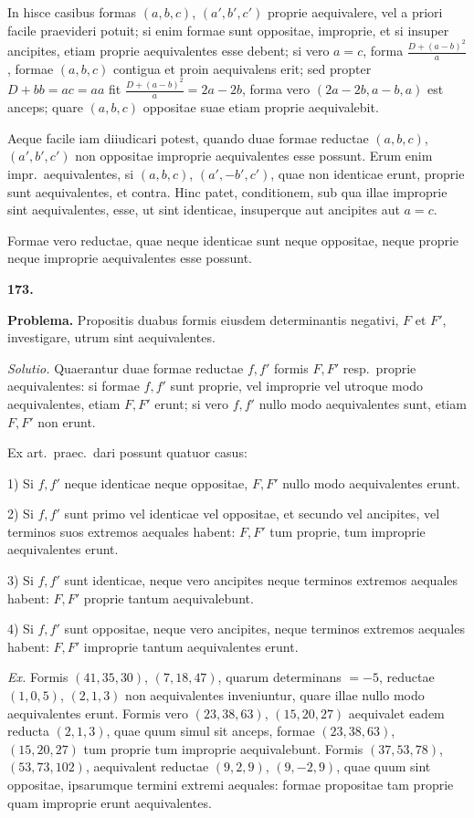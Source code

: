 \documentclass[12pt,a4paper]{article}
\theoremstyle{plain}
\theoremstyle{definition}
\theoremstyle{remark}
\begin{document}
In hisce casibus formas $(a,b,c)$, $(a',b',c')$ proprie aequivalere, vel a priori facile praevideri potuit; si enim formae sunt oppositae, improprie, et si insuper ancipites, etiam proprie aequivalentes esse debent; si vero $a=c$, forma $\frac{D+(a-b)^2}{a}$, formae $(a,b,c)$ contigua et proin aequivalens erit; sed propter $D+bb=ac=aa$ fit $\frac{D+(a-b)^2}{a}=2a-2b$, forma vero $(2a-2b,a-b,a)$ est anceps; quare $(a,b,c)$ oppositae suae etiam proprie aequivalebit.

Aeque facile iam diiudicari potest, quando duae formae reductae $(a,b,c)$, $(a',b',c')$ non oppositae improprie aequivalentes esse possunt. Erum enim impr.\ aequivalentes, si $(a,b,c)$, $(a',-b',c')$, quae non identicae erunt, proprie sunt aequivalentes, et contra. Hinc patet, conditionem, sub qua illae improprie sint aequivalentes, esse, ut sint identicae, insuperque aut ancipites aut $a=c$.

Formae vero reductae, quae neque identicae sunt neque oppositae, neque proprie neque improprie aequivalentes esse possunt.

\textbf{173.}

\textbf{Problema.} Propositis duabus formis eiusdem determinantis negativi, $F$ et $F'$, investigare, utrum sint aequivalentes.

\textit{Solutio.} Quaerantur duae formae reductae $f,f'$ formis $F,F'$ resp.\ proprie aequivalentes: si formae $f,f'$ sunt proprie, vel improprie vel utroque modo aequivalentes, etiam $F,F'$ erunt; si vero $f,f'$ nullo modo aequivalentes sunt, etiam $F,F'$ non erunt.

Ex art.\ praec.\ dari possunt quatuor casus:

1) Si $f,f'$ neque identicae neque oppositae, $F,F'$ nullo modo aequivalentes erunt.

2) Si $f,f'$ sunt primo vel identicae vel oppositae, et secundo vel ancipites, vel terminos suos extremos aequales habent: $F,F'$ tum proprie, tum improprie aequivalentes erunt.

3) Si $f,f'$ sunt identicae, neque vero ancipites neque terminos extremos aequales habent: $F,F'$ proprie tantum aequivalebunt.

4) Si $f,f'$ sunt oppositae, neque vero ancipites, neque terminos extremos aequales habent: $F,F'$ improprie tantum aequivalentes erunt.

\textit{Ex.} Formis $(41,35,30)$, $(7,18,47)$, quarum determinans $=-5$, reductae $(1,0,5)$, $(2,1,3)$ non aequivalentes inveniuntur, quare illae nullo modo aequivalentes erunt. Formis vero $(23,38,63)$, $(15,20,27)$ aequivalet eadem reducta $(2,1,3)$, quae quum simul sit anceps, formae $(23,38,63)$, $(15,20,27)$ tum proprie tum improprie aequivalebunt. Formis $(37,53,78)$, $(53,73,102)$, aequivalent reductae $(9,2,9)$, $(9,-2,9)$, quae quum sint oppositae, ipsarumque termini extremi aequales: formae propositae tam proprie quam improprie erunt aequivalentes.
\end{document}
